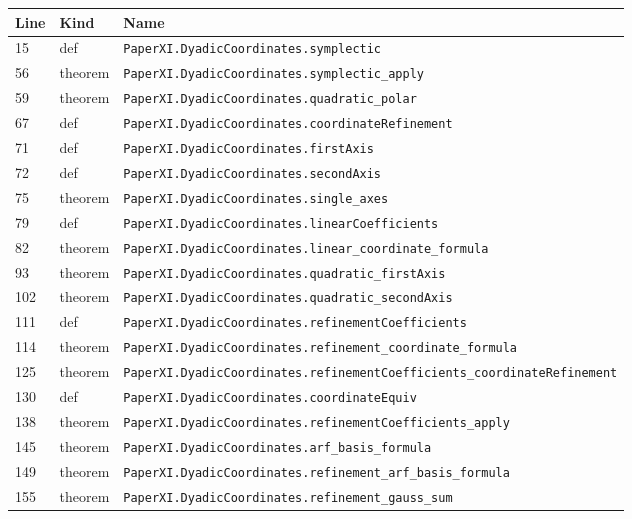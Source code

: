 \documentclass[10pt,oneside]{book}
\begin{document}
\begin{longtable}{@{}p{}p{}p{}@{}}\toprule Line&Kind&Name\\\midrule\endhead

15&def&\nolinkurl{PaperXI.DyadicCoordinates.symplectic}\\

56&theorem&\nolinkurl{PaperXI.DyadicCoordinates.symplectic_apply}\\

59&theorem&\nolinkurl{PaperXI.DyadicCoordinates.quadratic_polar}\\

67&def&\nolinkurl{PaperXI.DyadicCoordinates.coordinateRefinement}\\

71&def&\nolinkurl{PaperXI.DyadicCoordinates.firstAxis}\\

72&def&\nolinkurl{PaperXI.DyadicCoordinates.secondAxis}\\

75&theorem&\nolinkurl{PaperXI.DyadicCoordinates.single_axes}\\

79&def&\nolinkurl{PaperXI.DyadicCoordinates.linearCoefficients}\\

82&theorem&\nolinkurl{PaperXI.DyadicCoordinates.linear_coordinate_formula}\\

93&theorem&\nolinkurl{PaperXI.DyadicCoordinates.quadratic_firstAxis}\\

102&theorem&\nolinkurl{PaperXI.DyadicCoordinates.quadratic_secondAxis}\\

111&def&\nolinkurl{PaperXI.DyadicCoordinates.refinementCoefficients}\\

114&theorem&\nolinkurl{PaperXI.DyadicCoordinates.refinement_coordinate_formula}\\

125&theorem&\nolinkurl{PaperXI.DyadicCoordinates.refinementCoefficients_coordinateRefinement}\\

130&def&\nolinkurl{PaperXI.DyadicCoordinates.coordinateEquiv}\\

138&theorem&\nolinkurl{PaperXI.DyadicCoordinates.refinementCoefficients_apply}\\

145&theorem&\nolinkurl{PaperXI.DyadicCoordinates.arf_basis_formula}\\

149&theorem&\nolinkurl{PaperXI.DyadicCoordinates.refinement_arf_basis_formula}\\

155&theorem&\nolinkurl{PaperXI.DyadicCoordinates.refinement_gauss_sum}\\

\bottomrule\end{longtable}
\end{document}
